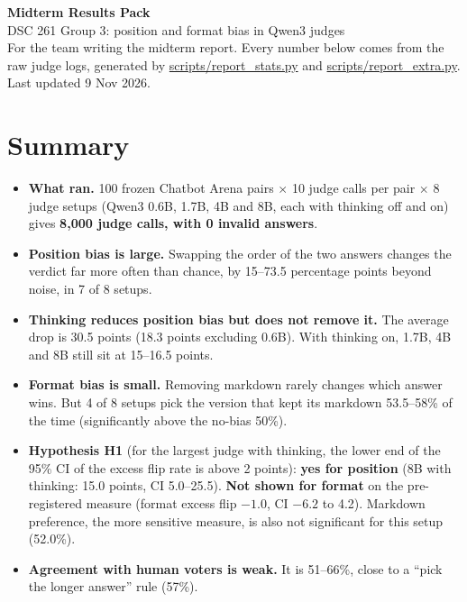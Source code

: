 \documentclass[10.5pt]{article}
\begin{document}
{\LARGE\bfseries Midterm Results Pack}\\[0.3em]
{\large DSC 261 Group 3: position and format bias in Qwen3 judges}\\[0.2em]
{\small For the team writing the midterm report. Every number below comes from the raw judge logs, generated
by \url{scripts/report_stats.py} and \url{scripts/report_extra.py}. Last updated 9 Nov 2026.}

\section{Summary}
\begin{itemize}
\item \textbf{What ran.} 100 frozen Chatbot Arena pairs $\times$ 10 judge calls per pair $\times$ 8 judge setups
(Qwen3 0.6B, 1.7B, 4B and 8B, each with thinking off and on) gives \textbf{8{,}000 judge calls, with 0 invalid
answers}.
\item \textbf{Position bias is large.} Swapping the order of the two answers changes the verdict far more often
than chance, by 15--73.5 percentage points beyond noise, in 7 of 8 setups.
\item \textbf{Thinking reduces position bias but does not remove it.} The average drop is 30.5 points (18.3 points
excluding 0.6B). With thinking on, 1.7B, 4B and 8B still sit at 15--16.5 points.
\item \textbf{Format bias is small.} Removing markdown rarely changes which answer wins. But 4 of 8 setups pick
the version that kept its markdown 53.5--58\% of the time (significantly above the no-bias 50\%).
\item \textbf{Hypothesis H1} (for the largest judge with thinking, the lower end of the 95\% CI of the excess
flip rate is above 2 points): \textbf{yes for position} (8B with thinking: 15.0 points, CI 5.0--25.5).
\textbf{Not shown for format} on the pre-registered measure (format excess flip $-1.0$, CI $-6.2$ to 4.2).
Markdown preference, the more sensitive measure, is also not significant for this setup (52.0\%).
\item \textbf{Agreement with human voters is weak.} It is 51--66\%, close to a ``pick the longer answer'' rule (57\%).
\end{itemize}
\end{document}
